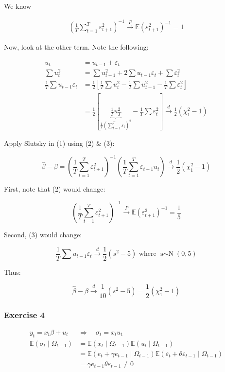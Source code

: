 {{\begin{enumerate}[label=(\alph*)]
{We know

\begin{align*}
\left(\frac{1}{T} \sum_{t=1}^{T} \varepsilon_{t+1}^{2}\right)^{-1} \xrightarrow{P} \mathbb{E}\left(\varepsilon_{t+1}^{2}\right)^{-1}=1 \tag{2}
\end{align*}

Now, look at the other term. Note the following:

\begin{align*}
u_{t} &= u_{t-1}+\varepsilon_{t} \\
\sum u_{t}^{2} &= \sum u_{t-1}^{2}+2 \sum u_{t-1} \varepsilon_{t}+\sum \varepsilon_{t}^{2} \\
\frac{1}{T} \sum u_{t-1} \varepsilon_{t} &= \frac{1}{2}\left[\frac{1}{T} \sum u_{t}^{2}-\frac{1}{T} \sum u_{t-1}^{2}-\frac{1}{T} \sum \varepsilon_{t}^{2}\right] \\
& =\frac{1}{2}\left[\underbrace{\frac{1}{T} u_{T}^{2}}_{\frac{1}{T}\left(\sum_{t=1}^T \varepsilon_t\right)^2}-\frac{1}{T} \sum \varepsilon_{t}^{2}\right] \xrightarrow{d} \frac{1}{2}\left(\chi_{1}^{2}-1\right)  \tag{3}
\end{align*}

Apply Slutsky in (1) using (2) \& (3):

$$
\hat{\beta}-\beta=\left(\frac{1}{T} \sum_{t=1}^{T} \varepsilon_{t+1}^{2}\right)^{-1}\left(\frac{1}{T} \sum_{t=1}^{T} \varepsilon_{t+1} u_{t}\right) \xrightarrow{d} \frac{1}{2}\left(\chi_{1}^{2}-1\right)
$$
}
{\item 
First, note that (2) would change:

$$
\left(\frac{1}{T} \sum_{t=1}^{T} \varepsilon_{t+1}^{2}\right)^{-1} \xrightarrow{P} \mathbb{E}\left(\varepsilon_{t+1}^{2}\right)^{-1}=\frac{1}{5}
$$

Second, (3) would change:

$$
\frac{1}{T} \sum u_{t-1} \varepsilon_{t} \xrightarrow{d} \frac{1}{2}\left(s^{2}-5\right) \text{ where } \operatorname{s\sim N}(0,5)
$$

Thus: 

$$
\hat{\beta}-\beta \xrightarrow{d} \frac{1}{10}\left(s^2-5\right)=\frac{1}{2}\left(\chi_1^2-1\right)
$$
}
\end{enumerate}
}
{
\subsubsection*{Exercise 4}

\begin{enumerate}[label=(\alph*)]
{\item 
$$
\begin{aligned}
y_{t}=x_{t} \beta+u_{t} & \Longrightarrow \quad \sigma_{t}=x_{t} u_{t} \\
\mathbb{E}\left(\sigma_{t} \mid \Omega_{t-1}\right) & =\mathbb{E}\left(x_{t} \mid \Omega_{t-1}\right) \mathbb{E}\left(u_{t} \mid \Omega_{t-1}\right) \\
& =\mathbb{E}\left(e_{t}+\gamma e_{t-1} \mid \Omega_{t-1}\right) \mathbb{E}\left(\varepsilon_{t}+\theta \varepsilon_{t-1} \mid \Omega_{t-1}\right) \\
& =\gamma e_{t-1} \theta \varepsilon_{t-1} \neq 0
\end{aligned}
$$

}
\end{enumerate}}}
